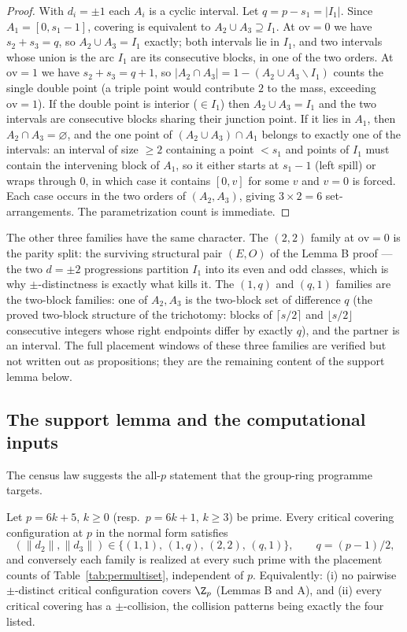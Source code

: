 \begin{proof}
With $d_i=\pm1$ each $A_i$ is a cyclic interval. Let $q=p-s_1=|I_1|$. Since
$A_1=[0,s_1-1]$, covering is equivalent to $A_2\cup A_3\supseteq I_1$.
At $\mathrm{ov}=0$ we have $s_2+s_3=q$, so $A_2\cup A_3=I_1$ exactly; both
intervals lie in $I_1$, and two intervals whose union is the arc $I_1$ are
its consecutive blocks, in one of the two orders. At $\mathrm{ov}=1$ we have
$s_2+s_3=q+1$, so $|A_2\cap A_3|=1-(A_2\cup A_3\smallsetminus I_1)$ counts
the single double point (a triple point would contribute $2$ to the mass,
exceeding $\mathrm{ov}=1$). If the double point is interior
($\in I_1$) then $A_2\cup A_3=I_1$ and the two intervals are consecutive
blocks sharing their junction point. If it lies in $A_1$, then
$A_2\cap A_3=\varnothing$, and the one point of $(A_2\cup A_3)\cap A_1$
belongs to exactly one of the intervals: an interval of size $\ge2$
containing a point $<s_1$ and points of $I_1$ must contain the intervening
block of $A_1$, so it either starts at $s_1-1$ (left spill) or wraps through
$0$, in which case it contains $[0,v]$ for some $v$ and $v=0$ is forced.
Each case occurs in the two orders of $(A_2,A_3)$, giving $3\times2=6$
set-arrangements. The parametrization count is immediate.
\end{proof}

The other three families have the same character. The $(2,2)$ family at
$\mathrm{ov}=0$ is the parity split: the surviving structural pair
$(E,O)$ of the Lemma B proof --- the two $d=\pm2$ progressions partition
$I_1$ into its even and odd classes, which is why $\pm$-distinctness is
exactly what kills it. The $(1,q)$ and $(q,1)$ families are the two-block
families: one of $A_2,A_3$ is the two-block set of difference $q$
(the proved two-block structure of the trichotomy: blocks of
$\lceil s/2\rceil$ and $\lfloor s/2\rfloor$ consecutive integers whose right
endpoints differ by exactly $q$), and the partner is an interval. The full
placement windows of these three families are verified but not written out
as propositions; they are the remaining content of the support lemma below.

\subsection{The support lemma and the computational inputs}
\label{sec:gt-support}

The census law suggests the all-$p$ statement that the group-ring programme
targets.

\begin{conjecture}\label{conj:SL}
Let $p=6k+5$, $k\ge0$ (resp.\ $p=6k+1$, $k\ge3$) be prime. Every critical
covering configuration at $p$ in the normal form satisfies
\[
(\|d_2\|,\|d_3\|)\in\{(1,1),\,(1,q),\,(2,2),\,(q,1)\},
\qquad q=(p-1)/2,
\]
and conversely each family is realized at every such prime with the
placement counts of Table~\ref{tab:permultiset}, independent of $p$.
Equivalently: \textup{(i)} no pairwise $\pm$-distinct critical
configuration covers $\Z_p$ (Lemmas B and A), and \textup{(ii)} every
critical covering has a $\pm$-collision, the collision patterns being
exactly the four listed.
\end{conjecture}

